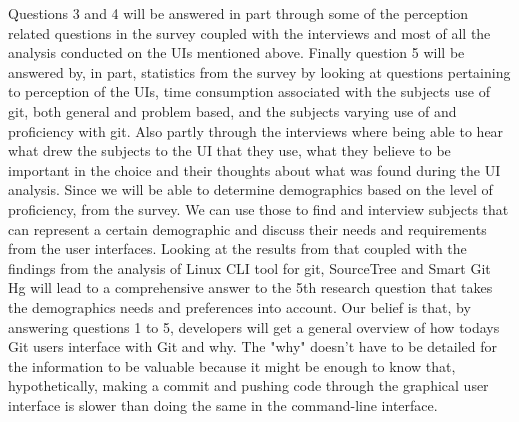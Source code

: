 \documentclass[a4paper,oneside]{bth} %
\begin{document}
			Questions 3 and 4 will be answered in part through some of the perception related questions in the survey coupled with the interviews and most of all the analysis conducted on the UIs mentioned above. Finally question 5 will be answered by, in part, statistics from the survey by looking at questions pertaining to perception of the UIs, time consumption associated with the subjects use of git, both general and problem based, and the subjects varying use of and proficiency with git. Also partly through the interviews where being able to hear what drew the subjects to the UI that they use, what they believe to be important in the choice and their thoughts about what was found during the UI analysis. Since we will be able to determine demographics based on the level of proficiency, from the survey. We can use those to find and interview subjects that can represent a certain demographic and discuss their needs and requirements from the user interfaces. Looking at the results from that coupled with the findings from the analysis of Linux CLI tool for git, SourceTree and Smart Git Hg will lead to a comprehensive answer to the 5th research question that takes the demographics needs and preferences into account.  
			Our belief is that, by answering questions 1 to 5, developers will get a general overview of how todays Git users interface with Git and why. The "why" doesn't have to be detailed for the information to be valuable because it might be enough to know that, hypothetically, making a commit and pushing code through the graphical user interface is slower than doing the same in the command-line interface.  
		 
\end{document}
